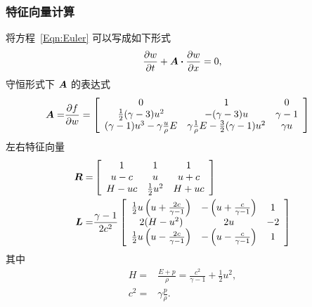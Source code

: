 \documentclass[10.5pt
]{article}
\begin{document}
\subsubsection{特征向量计算}\label{Appendix}
将方程~\eqref{Eqn:Euler} 可以写成如下形式
\begin{align}
\frac{\partial w}{\partial t} + \vb*A \vdot \frac{\partial w}{\partial
x}= 0,\label{Eqn:Euler2}
\end{align}
守恒形式下 $\vb*A$ 的表达式
\begin{align*}
\vb*A =& \frac{\partial f}{\partial w} = \left[\begin{array}{ccc} 0 & 1 & 0
\\
\frac{1}{2} (\gamma  - 3) u^2 & -(\gamma - 3) u & \gamma - 1
\\
(\gamma - 1) u^3 - \gamma \frac{u}{\rho} E & \gamma \frac{1}{\rho} E-\frac{3}{2} (\gamma
- 1) u^2 & \gamma u
\end{array}
\right]
\end{align*}
左右特征向量
\begin{align*}
\vb*R =& \left[\begin{array}{ccc} 1 & 1 & 1
\\
u - c & u & u + c
\\
H - u c & \frac{1}{2} u^2 & H + u c
\end{array}
\right]
\\
\vb*L =& \frac{\gamma - 1}{2 c^2} \left[\begin{array}{ccc} \frac{1}{2} u \left(u + \frac{2
c}{\gamma - 1}\right) & -\left(u + \frac{c}{\gamma - 1}\right) & 1
\\
2(H - u^2) & 2 u & - 2
\\
\frac{1}{2} u \left(u - \frac{2 c}{\gamma - 1}\right) & -\left(u - \frac{c}{\gamma -
1}\right) & 1
\end{array}
\right]
\end{align*}
其中
\begin{align*}
H =& \frac{E + p}{\rho} = \frac{c^2}{\gamma - 1} + \frac{1}{2} u^2,
\\
c^2 =& \gamma \frac{p}{\rho}.
\end{align*}
\end{document}
